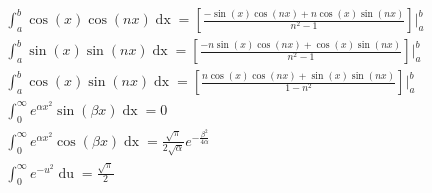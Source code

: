 \documentclass[fleqn]{article}
\begin{document}
\begin{gather*}
%
\int_{a}^{b}\cos{(x)}\cos{(nx)}\mathop{dx} =\left[\frac{-\sin{(x)}\cos{(nx)} + n\cos{(x)}\sin{(nx)}}{n^{2} - 1}\right]\Bigg|_{a}^{b}\\
%
\int_{a}^{b}\sin{(x)}\sin{(nx)}\mathop{dx} =\left[\frac{-n\sin{(x)}\cos{(nx)} + \cos{(x)}\sin{(nx)}}{n^{2} - 1}\right]\Bigg|_{a}^{b}\\
%
\int_{a}^{b}\cos{(x)}\sin{(nx)}\mathop{dx} =\left[\frac{n\cos{(x)}\cos{(nx)} + \sin{(x)}\sin{(nx)}}{1 - n^{2}}\right]\Bigg|_{a}^{b}\\
%
\int_{0}^{\infty}e^{\alpha x^{2}}\sin{(\beta x)}\mathop{dx} = 0\\
%
\int_{0}^{\infty}e^{\alpha x^{2}}\cos{(\beta x)}\mathop{dx} = \frac{\sqrt{\pi}}{2\sqrt{\alpha}}e^{-\frac{\beta^{2}}{4\alpha}}\\
%
\int_{0}^{\infty}e^{-u^{2}}\mathop{du} = \frac{\sqrt{\pi}}{2}\\
%
\end{gather*}
\end{document}

